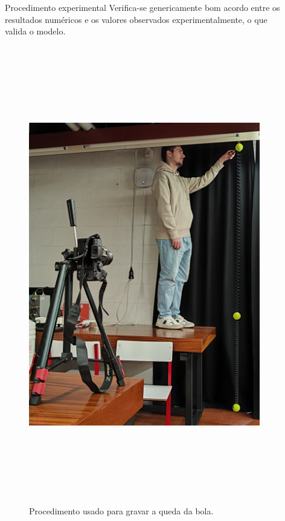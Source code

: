 \documentclass[final]{beamer}
\newlength{\sepwidth}
\newlength{\colwidth}
\newcommand{\separatorcolumn}{\begin{column}{\sepwidth}\end{column}}
\begin{document}
\begin{frame}[t,fragile]
\begin{columns}[t]
\begin{column}{\colwidth}
\begin{block}{Procedimento experimental}
Verifica-se genericamente bom acordo entre os resultados numéricos e os valores
observados experimentalmente, o que valida o modelo.
\vspace{2cm}
\begin{center}
\begin{figure}
\includegraphics[height=20cm]{images/Final.jpg}
\caption{Procedimento usado para gravar a queda da bola.}
\end{figure}
\end{center}
\end{block}
\end{column}

\separatorcolumn

\begin{column}{\colwidth}


\end{column}
\end{columns}
\end{frame}
\end{document}
